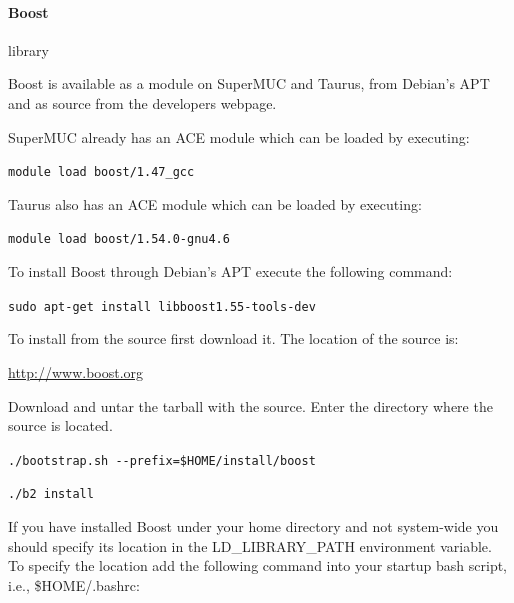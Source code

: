 \documentclass[11pt,a4paper, oneside]{book} %
\newcommand{\boosturl}{\url{http://www.boost.org} }
\newcommand{\installloc}[1]{\$HOME/install/#1}
\begin{document}











\paragraph{Boost} library

Boost is available as a module on SuperMUC and Taurus, from Debian's APT and as
source from the developers webpage.

SuperMUC already has an ACE module which can be loaded by executing:

\texttt{module load boost/1.47\_gcc}

Taurus also has an ACE module which can be loaded by executing:

\texttt{module load boost/1.54.0-gnu4.6}

To install Boost through Debian's APT execute the following command:

\texttt{sudo apt-get install libboost1.55-tools-dev}

To install from the source first download it.
The location of the source is:

\boosturl

Download and untar the tarball with the source.
Enter the directory where the source is located.

\texttt{./bootstrap.sh -{}-prefix=\installloc{boost}}

\texttt{./b2 install}

If you have installed Boost under your home directory and not system-wide you
should specify its location in the LD\_LIBRARY\_PATH environment variable. To
specify the location add the following command into your startup bash script,
i.e., \$HOME/.bashrc:
\end{document}
